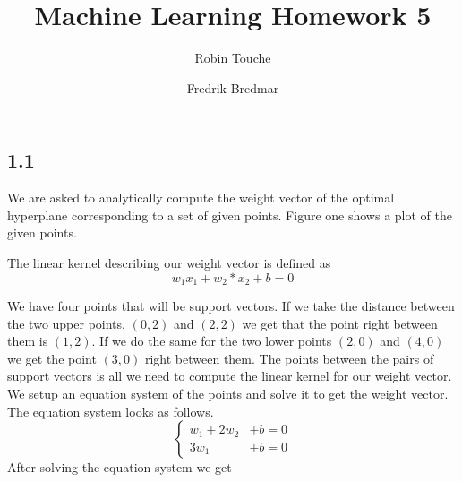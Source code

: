 \documentclass{article}
\author{
  Robin Touche \\
  \and
  Fredrik Bredmar
}
\title{Machine Learning Homework 5}
\begin{document}
\maketitle

\subsection*{1.1}
We are asked to analytically compute the weight vector of the optimal hyperplane corresponding to a set of given points. 
Figure one shows a plot of the given points. 

The linear kernel describing our weight vector is defined as
\[
w_1x_1 + w_2*x_2 + b = 0
\]

We have four points that will be support vectors.
If we take the distance between the two upper points, $(0,2)$ and $(2,2)$ we get that the point right between them is $(1,2)$.
If we do the same for the two lower points $(2,0)$ and $(4,0)$ we get the point $(3,0)$ right between them. 
The points between the pairs of support vectors is all we need to compute the linear kernel for our weight vector. We setup an equation system of the points and solve it to get the weight vector. 
The equation system looks as follows.
\[
\begin{cases}

  w_1  + 2w_2 &+ b = 0 \\
  3w_1 &+  b = 0 

\end{cases}
\]
After solving the equation system we get
\end{document}
